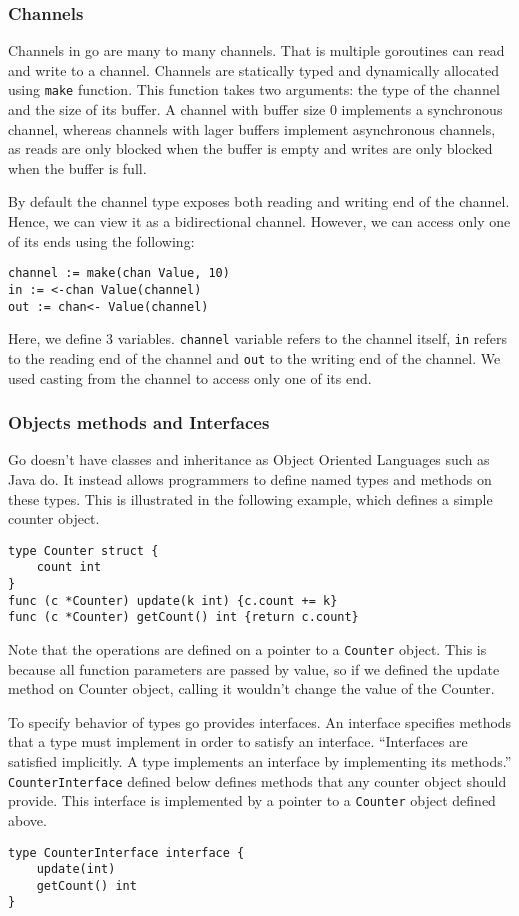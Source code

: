 \documentclass[12pt,a4paper]{article}
\begin{document}
\subsubsection{Channels}
Channels in go are many to many channels. That is multiple goroutines can
read and write to a channel. Channels are statically typed and
dynamically allocated using \texttt{make} function. This function takes 
two arguments: the type of the channel and the size of its buffer.
A channel with buffer size 0 implements a synchronous channel, whereas 
channels with lager buffers implement asynchronous channels, as reads
are only blocked when the buffer is empty and writes are only blocked
when the buffer is full.

By default the channel type exposes both reading and writing end of the
channel. Hence, we can view it as a bidirectional channel. 
However, we can access only one of its ends using the following:
\begin{lstlisting}
channel := make(chan Value, 10)
in := <-chan Value(channel)
out := chan<- Value(channel)
\end{lstlisting}
Here, we define 3 variables. \texttt{channel} variable refers to the 
channel itself, \texttt{in} refers to the reading end of the channel
and \texttt{out} to the writing end of the channel. We used casting
from the channel to access only one of its end.

\subsubsection{Objects methods and Interfaces}
Go doesn't have classes and inheritance as Object Oriented Languages 
such as Java do. It instead allows programmers to define named types
and methods on these types. This is illustrated in the following example,
which defines a simple counter object.
\begin{lstlisting}
type Counter struct {
    count int
}
func (c *Counter) update(k int) {c.count += k}
func (c *Counter) getCount() int {return c.count}
\end{lstlisting}
Note that the operations are defined on a pointer to a \texttt{Counter}
object. This is because all function parameters are passed by value, so
if we defined the update method on Counter object, calling it wouldn't
change the value of the Counter.

To specify behavior of types go provides interfaces. An interface
specifies methods that a type must implement in order to satisfy an 
interface. ``Interfaces are satisfied implicitly. A type implements 
an interface by implementing its methods.'' \cite{tour}
\texttt{CounterInterface} defined below defines methods that any counter
object should provide. This interface is implemented by a pointer to
a \texttt{Counter} object defined above.
\begin{lstlisting}
type CounterInterface interface {
    update(int)
    getCount() int
}
\end{lstlisting}
\end{document}
